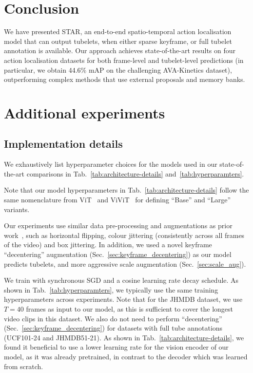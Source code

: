 \documentclass[10pt,twocolumn,letterpaper]{article}
\begin{document}
 \section{Conclusion}
\vspace{-0.5\baselineskip}

We have presented STAR, an end-to-end spatio-temporal action localisation model that can output tubelets, when either sparse keyframe, or full tubelet annotation is available.
Our approach achieves state-of-the-art results on four action localisation datasets for both frame-level and tubelet-level predictions (in particular, we obtain 44.6\% mAP on the challenging AVA-Kinetics dataset), outperforming complex methods that use external proposals and memory banks.
 

{\small


}

\appendix

\section{Additional experiments}
\label{sec:app_experiments}

\subsection{Implementation details}

We exhaustively list hyperparameter choices for the models used in our state-of-the-art comparisons in Tab.~\ref{tab:architecture-details} and~\ref{tab:hyperparamters}.

Note that our model hyperparameters in Tab.~\ref{tab:architecture-details} follow the same nomenclature from ViT~\cite{dosovitskiy_iclr_2021} and ViViT~\cite{arnab2021vivit} for defining ``Base'' and ``Large'' variants.

Our experiments use similar data pre-processing and augmentations as prior work~\cite{feichtenhofer_iccv_2019, wu2022memvit, wu_cvpr_2019}, such as horizontal flipping, colour jittering (consistently across all frames of the video) and box jittering.
In addition, we used a novel keyframe ``decentering'' augmentation (Sec.~\ref{sec:keyframe_decentering}) as our model predicts tubelets, and more aggressive scale augmentation (Sec.~\ref{sec:scale_aug}).

We train with synchronous SGD and a cosine learning rate decay schedule.
As shown in Tab.~\ref{tab:hyperparamters}, we typically use the same training hyperparameters across experiments.
Note that for the JHMDB dataset, we use $T = 40$ frames as input to our model, as this is sufficient to cover the longest video clips in this dataset.
We also do not need to perform ``decentering'' (Sec.~\ref{sec:keyframe_decentering}) for datasets with full tube annotations (UCF101-24 and JHMDB51-21).
As shown in Tab.~\ref{tab:architecture-details}, we found it beneficial to use a lower learning rate for the vision encoder of our model, as it was already pretrained, in contrast to the decoder which was learned from scratch.
\end{document}
